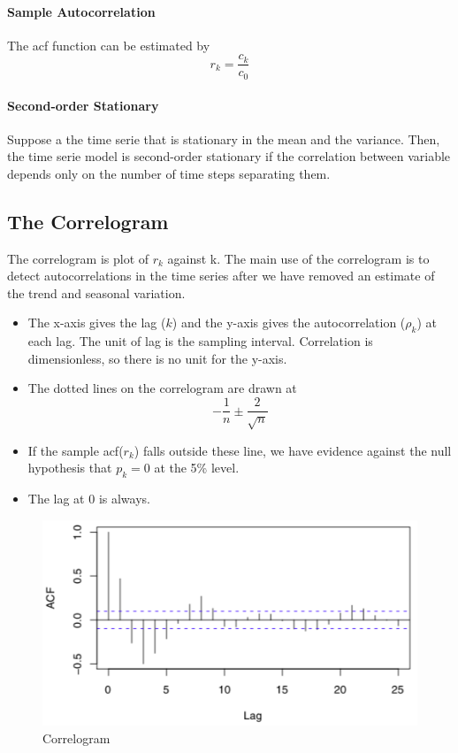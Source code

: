 \paragraph{Sample Autocorrelation}
The acf function can be estimated by
\[ r_k = \frac{c_k}{c_0} \]

\paragraph{Second-order Stationary}
Suppose a the time serie that is stationary in the mean and the variance. Then, the time serie model is second-order stationary if the correlation between variable depends only on the number of time steps separating them.


\subsection{The Correlogram}
The correlogram is plot of $r_k$ against k. The main use of the correlogram is to detect autocorrelations in the time series after we have removed an estimate of the trend and seasonal variation.

\begin{itemize}
    \item[\textbullet] The x-axis gives the lag ($k$) and the y-axis gives the autocorrelation ($\rho_k$) at each lag. The unit of lag is the sampling interval. Correlation is dimensionless, so there is no unit for the y-axis.
    \item[\textbullet] The dotted lines on the correlogram are drawn at 
        \[ -\frac{1}{n} \pm \frac{2}{\sqrt{n}} \]
    \item[] If the sample acf($r_k$) falls outside these line, we have evidence against the null hypothesis that $p_k = 0$ at the 5\% level.
    \item[\textbullet] The lag at 0 is always.
\end{itemize}

\begin{figure}[!ht]
    \centering 
    \includegraphics[scale=0.7]{src/SerieChronologique/Correlogram.png}
    \caption{Correlogram}
\end{figure}



